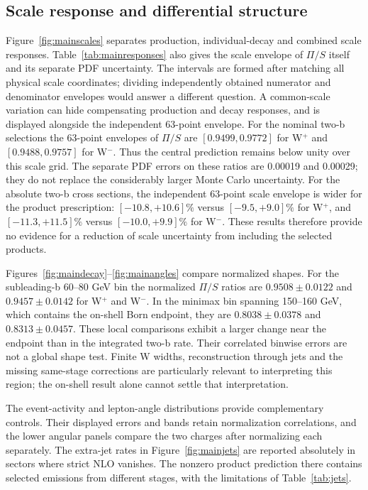 \subsection{Scale response and differential structure}

Figure~\ref{fig:mainscales} separates production, individual-decay and
combined scale responses. Table~\ref{tab:mainresponses} also gives the
scale envelope of $\Pi/S$ itself and its separate PDF uncertainty.
The intervals are formed after matching all physical scale coordinates;
dividing independently obtained numerator and denominator envelopes
would answer a different question. A common-scale variation can hide
compensating production and decay responses, and is displayed alongside
the independent 63-point envelope.
For the nominal two-b selections the 63-point envelopes of $\Pi/S$ are
$[0.9499,0.9772]$ for W$^+$ and $[0.9488,0.9757]$ for W$^-$. Thus the
central prediction remains below unity over this scale grid. The separate
PDF errors on these ratios are 0.00019 and 0.00029; they do not replace
the considerably larger Monte Carlo uncertainty.
For the absolute two-b cross sections, the independent 63-point scale
envelope is wider for the product prescription: $[-10.8,+10.6]\%$ versus
$[-9.5,+9.0]\%$ for W$^+$, and $[-11.3,+11.5]\%$ versus
$[-10.0,+9.9]\%$ for W$^-$. These results therefore provide no evidence
for a reduction of scale uncertainty from including the selected products.



Figures~\ref{fig:maindecay}--\ref{fig:mainangles} compare normalized shapes.
For the subleading-b 60--80 GeV bin the normalized $\Pi/S$ ratios are
$0.9508\pm0.0122$ and $0.9457\pm0.0142$ for W$^+$ and W$^-$.
In the minimax bin spanning 150--160 GeV, which contains the on-shell
Born endpoint, they are $0.8038\pm0.0378$ and $0.8313\pm0.0457$.
These local comparisons exhibit a larger change near the endpoint than
in the integrated two-b rate. Their correlated binwise errors are not a
global shape test. Finite W widths, reconstruction through jets and the
missing same-stage corrections are particularly relevant to interpreting
this region; the on-shell result alone cannot settle that interpretation.

The event-activity and lepton-angle distributions provide complementary
controls. Their displayed errors and bands retain normalization
correlations, and the lower angular panels compare the two charges after
normalizing each separately. The extra-jet rates in
Figure~\ref{fig:mainjets} are reported absolutely in sectors where strict
NLO vanishes. The nonzero product prediction there contains selected
emissions from different stages, with the limitations of
Table~\ref{tab:jets}.

